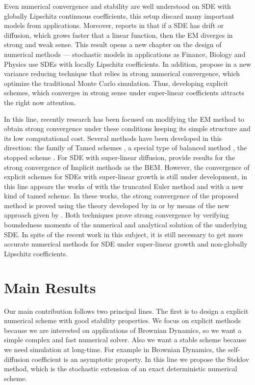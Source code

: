 		Even numerical convergence and stability are well understood on SDE with globally Lipschitz 
	continuous coefficients, this setup discard  many important models from applications.
	Moreover, \citeauthor*{Hutzenthaler2009} reports in \cite{Hutzenthaler2009} that if a SDE
	has drift or diffusion,	which grows faster that a linear function, then the EM diverges in strong and weak sense.
	This result opens a new chapter on the design of numerical methods ---
	stochastic models in applications as Finance, Biology and Physics use SDEs with locally Lipschitz 
	coefficients. In addition, \citeauthor*{Giles2008} propose in \cite{Giles2008} a new variance reducing technique
	that relies in strong numerical convergence, which optimize the traditional Monte Carlo simulation. Thus, developing
	explicit schemes, which converges in strong sense under super-linear coefficients attracts the right now attention.
	
		In this line, recently research has been focused on modifying the EM method to obtain strong convergence  under 
	these conditions keeping its simple structure and  its low computational cost. Several methods have been developed 
	in this direction:  the family of  Tamed schemes
	\cite{Hutzenthaler2012a, Wang2011, Zong2014,Hutzenthaler2015}, 
	a special type of balanced method \cite{Tretyakov2013},  the stopped scheme \cite{Liu2013a} .
	For SDE with super-linear diffusion, \citeauthor{Mao2013a} provide results
	for the strong convergence of Implicit methods as the BEM. However, the convergence of explicit schemes for
	SDEs with super-linear growth is still under development, in this line appears the works of
	\citeauthor{Mao2015} \cite{Mao2015} with the truncated Euler method and \cite{Sabanis2015} with a new kind of
	tamed scheme. In these works, the strong convergence of the proposed method
	is proved using the theory developed by in \citet*{Higham2002b} or by means of  the new 
	approach given by  \citet{Hutzenthaler2015}.
	Both techniques prove strong convergence by verifying boundedness moments of the numerical and 
	analytical solution of the underlying SDE. In spite of the recent work in this subject,  it is still necessary
	to get more accurate numerical methods for SDE under super-linear growth and 
	non-globally Lipschitz coefficients.

\section{Main Results}
		Our main contribution follows two principal lines.  The first is to design a explicit numerical
	scheme with good stability properties. We focus on explicit methods because we are interested on applications of 
	Brownian Dynamics, so we want a simple complex and fast numerical solver. Also we want a stable scheme 
	because we need simulation at long-time. For example in Brownian Dynamics, the self-diffusion
	coefficient is an asymptotic property. In this line we propose the Steklov method, which is the stochastic 
	extension of an exact deterministic numerical scheme. 
		
